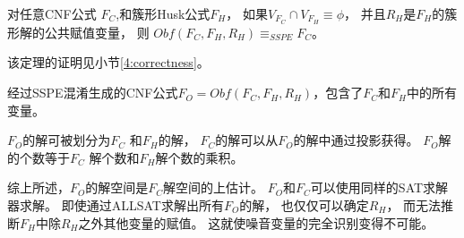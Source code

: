 \begin{theorem}\label{4:SSPEinference}
对任意CNF公式 $F_C$,和簇形Husk公式$F_H$，
如果$V_{F_C} \cap V_{F_H}\equiv \phi$，
并且$R_H$是$F_H$的簇形解的公共赋值变量，
则 $Obf(F_C,F_H,R_H) \equiv_{SSPE} F_C$。
\end{theorem}

该定理的证明见小节\ref{4:correctness}。



经过SSPE混淆生成的CNF公式$F_O=Obf(F_C,F_H,R_H)$，包含了$F_C$和$F_H$中的所有变量。

%
%
$F_O$的解可被划分为$F_C$ 和$F_H$的解，
$F_C$的解可以从$F_O$的解中通过投影获得。
$F_O$解的个数等于$F_C$ 解个数和$F_H$解个数的乘积。
%
%

综上所述，$F_O$的解空间是$F_C$解空间的上估计。
$F_O$和$F_C$可以使用同样的SAT求解器求解。
即使通过ALLSAT求解出所有$F_O$的解，
也仅仅可以确定$R_H$，
而无法推断$F_H$中除$R_H$之外其他变量的赋值。
这就使噪音变量的完全识别变得不可能。

